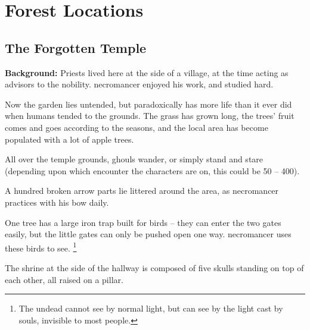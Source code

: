 \section{Forest Locations}

\begin{multicols}{2}

\subsection[Forgotten Temple]{The Forgotten Temple}\label{necromancers_lair}


\textbf{Background:}
Priests lived here at the side of a village, at the time acting as advisors to the nobility.
\Gls{necromancer} enjoyed his work, and studied hard.

Now the garden lies untended, but paradoxically has more life than it ever did when humans tended to the grounds.
The grass has grown long, the trees' fruit comes and goes according to the seasons, and the local area has become populated with a lot of apple trees.


All over the temple grounds, ghouls wander, or simply stand and stare
(depending upon which encounter the characters are on, this could be 50 -- 400).

A hundred broken arrow parts lie littered around the area, as \gls{necromancer} practices with his bow daily.

One tree has a large iron trap built for birds -- they can enter the two gates easily, but the little gates can only be pushed open one way.
\Gls{necromancer} uses these birds to see.%
\footnote{The undead cannot see by normal light, but can see by the light cast by souls, invisible to most people.}



The shrine at the side of the hallway is composed of five skulls standing on top of each other, all raised on a pillar.


\end{multicols}
